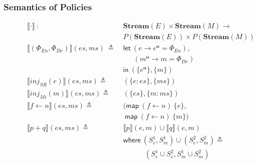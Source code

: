 \documentclass[sigconf,usenames,dvipsnames,svgnames,table]{acmart}
\newcommand{\interp}[1]{\llbracket #1 \rrbracket}
\newcommand{\obf}[1]{#1^\mathbf{o}}
\begin{document}
      \subsubsection{Semantics of Policies}\label{sec:spec:sem:pol}
        \begin{figure}
          \centering
          { %
          \begin{align*}
            \interp { \cdot }\ 
              :\ \ &
              \mathbf{Stream}(E)\times \mathbf{Stream}(M) \rightarrow \\
              & P(\mathbf{Stream}(E))\times P(\mathbf{Stream}(M)) 
              \\\hline
            \interp {(\Phi_{En}, \Phi_{De})}(es, ms)\
              \triangleq\
              & \mathsf{let}\ (e \rightarrow \obf{e} = \Phi_{En}),\\
              & \quad\ \      (\obf{m} \rightarrow m = \Phi_{De}) \\
              & \mathsf{in}\
              (\{\obf{e}\}, \{m\})
              \\
            \interp { inj_{SR}(e) }(es, ms)
              \triangleq\ &
              (\{e : es\}, \{ms\}) 
              \\
            \interp { inj_{Mi}(m) }(es, ms)
              \triangleq\ &
              (\{es\},\{m : ms\})
              \\
            \interp { f \leftarrow n }(es, ms)
              \triangleq\ 
              & (\mathsf{map}\ (f\leftarrow n)\ \{e\},\\
              &\ \mathsf{map}\ (f\leftarrow n)\ \{m\})
              \\ %
            \interp { p + q }(es, ms)
              \triangleq\ &
              \interp { p }(e, m)\cup
              \interp { q }(e, m) \\
              &\mathsf{where}\ (S_e^1, S_m^1)\cup (S_e^2, S_m^2)\triangleq\\
              &\quad\quad\quad (S_e^1\cup S_e^2, S_m^1\cup S_m^2)\\

\end{align*}}
\end{figure}
\end{document}
